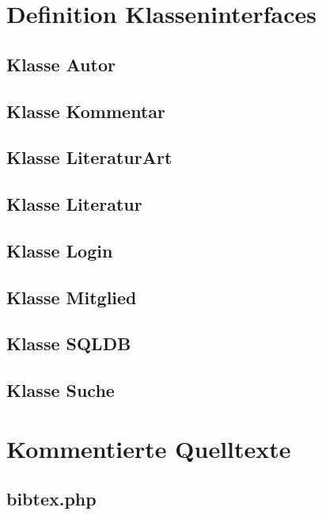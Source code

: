 \section{Definition Klasseninterfaces}
\subsection{Klasse Autor}


\subsection{Klasse Kommentar}


\subsection{Klasse LiteraturArt}


\subsection{Klasse Literatur}


\subsection{Klasse Login}


\subsection{Klasse Mitglied}


\subsection{Klasse SQLDB}


\subsection{Klasse Suche}


\section{Kommentierte Quelltexte}
\subsection{bibtex.php}


